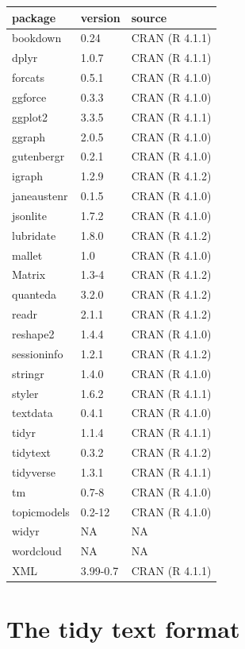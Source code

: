 \documentclass[
]{book}
\begin{document}
\begin{longtable}[]{@{}lll@{}}
\toprule
package & version & source \\
\midrule
\endhead
bookdown & 0.24 & CRAN (R 4.1.1) \\
dplyr & 1.0.7 & CRAN (R 4.1.1) \\
forcats & 0.5.1 & CRAN (R 4.1.0) \\
ggforce & 0.3.3 & CRAN (R 4.1.0) \\
ggplot2 & 3.3.5 & CRAN (R 4.1.1) \\
ggraph & 2.0.5 & CRAN (R 4.1.0) \\
gutenbergr & 0.2.1 & CRAN (R 4.1.0) \\
igraph & 1.2.9 & CRAN (R 4.1.2) \\
janeaustenr & 0.1.5 & CRAN (R 4.1.0) \\
jsonlite & 1.7.2 & CRAN (R 4.1.0) \\
lubridate & 1.8.0 & CRAN (R 4.1.2) \\
mallet & 1.0 & CRAN (R 4.1.0) \\
Matrix & 1.3-4 & CRAN (R 4.1.2) \\
quanteda & 3.2.0 & CRAN (R 4.1.2) \\
readr & 2.1.1 & CRAN (R 4.1.2) \\
reshape2 & 1.4.4 & CRAN (R 4.1.0) \\
sessioninfo & 1.2.1 & CRAN (R 4.1.2) \\
stringr & 1.4.0 & CRAN (R 4.1.0) \\
styler & 1.6.2 & CRAN (R 4.1.1) \\
textdata & 0.4.1 & CRAN (R 4.1.0) \\
tidyr & 1.1.4 & CRAN (R 4.1.1) \\
tidytext & 0.3.2 & CRAN (R 4.1.2) \\
tidyverse & 1.3.1 & CRAN (R 4.1.1) \\
tm & 0.7-8 & CRAN (R 4.1.0) \\
topicmodels & 0.2-12 & CRAN (R 4.1.0) \\
widyr & NA & NA \\
wordcloud & NA & NA \\
XML & 3.99-0.7 & CRAN (R 4.1.1) \\
\bottomrule
\end{longtable}

\hypertarget{tidytext}{%
\chapter{The tidy text format}\label{tidytext}}
\end{document}
